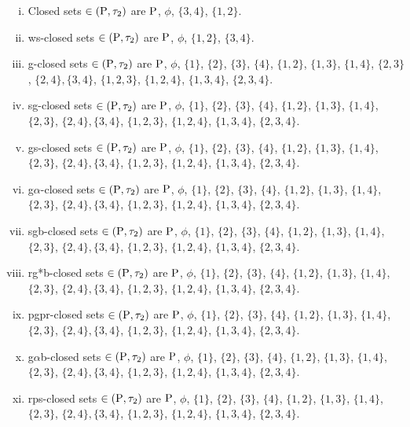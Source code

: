 \begin{exm}
\begin{enumerate}[(i)]
\item Closed sets $\in(\mathrm{P}, \tau_{2})$ are $\mathrm{P}$, $\phi$, $\{3, 4\}$, $\{1, 2\}$.
\item ws-closed sets $\in(\mathrm{P}, \tau_{2})$ are $\mathrm{P}$, $\phi$, $\{1, 2\}$, $\{3, 4\}$.
\item g-closed sets $\in(\mathrm{P}, \tau_{2})$ are $\mathrm{P}$, $\phi$, $\{1\}$, $\{2\}$, $\{3\}$, $\{4\}$, $\{1, 2\}$, $\{1, 3\}$, $\{1, 4\}$, $\{2, 3\}$, $\{2, 4\}, \{3, 4\}$, $\{1, 2, 3\}$, $\{1, 2, 4\}$, $\{1, 3, 4\}$, $\{2, 3, 4\}$.
\item sg-closed sets $\in(\mathrm{P}, \tau_{2})$ are $\mathrm{P}$, $\phi$, $\{1\}$, $\{2\}$, $\{3\}$, $\{4\}$, $\{1, 2\}$, $\{1, 3\}$, $\{1, 4\}$, $\{2, 3\}$, $\{2, 4\}, \{3, 4\}$, $\{1, 2, 3\}$, $\{1, 2, 4\}$, $\{1, 3, 4\}$, $\{2, 3, 4\}$.
\item gs-closed sets $\in(\mathrm{P}, \tau_{2})$ are $\mathrm{P}$, $\phi$, $\{1\}$, $\{2\}$, $\{3\}$, $\{4\}$, $\{1, 2\}$, $\{1, 3\}$, $\{1, 4\}$, $\{2, 3\}$, $\{2, 4\}, \{3, 4\}$, $\{1, 2, 3\}$, $\{1, 2, 4\}$, $\{1, 3, 4\}$, $\{2, 3, 4\}$.
\item g$\alpha$-closed sets $\in(\mathrm{P}, \tau_{2})$ are $\mathrm{P}$, $\phi$, $\{1\}$, $\{2\}$, $\{3\}$, $\{4\}$, $\{1, 2\}$, $\{1, 3\}$, $\{1, 4\}$, $\{2, 3\}$, $\{2, 4\}, \{3, 4\}$, $\{1, 2, 3\}$, $\{1, 2, 4\}$, $\{1, 3, 4\}$, $\{2, 3, 4\}$.
\item sgb-closed sets $\in(\mathrm{P}, \tau_{2})$ are $\mathrm{P}$, $\phi$, $\{1\}$, $\{2\}$, $\{3\}$, $\{4\}$, $\{1, 2\}$, $\{1, 3\}$, $\{1, 4\}$, $\{2, 3\}$, $\{2, 4\}, \{3, 4\}$, $\{1, 2, 3\}$, $\{1, 2, 4\}$, $\{1, 3, 4\}$, $\{2, 3, 4\}$.
\item rg*b-closed sets $\in(\mathrm{P}, \tau_{2})$ are $\mathrm{P}$, $\phi$, $\{1\}$, $\{2\}$, $\{3\}$, $\{4\}$, $\{1, 2\}$, $\{1, 3\}$, $\{1, 4\}$, $\{2, 3\}$, $\{2, 4\}, \{3, 4\}$, $\{1, 2, 3\}$, $\{1, 2, 4\}$, $\{1, 3, 4\}$, $\{2, 3, 4\}$.
\item pgpr-closed sets $\in(\mathrm{P}, \tau_{2})$ are $\mathrm{P}$, $\phi$, $\{1\}$, $\{2\}$, $\{3\}$, $\{4\}$, $\{1, 2\}$, $\{1, 3\}$, $\{1, 4\}$, $\{2, 3\}$, $\{2, 4\}, \{3, 4\}$, $\{1, 2, 3\}$, $\{1, 2, 4\}$, $\{1, 3, 4\}$, $\{2, 3, 4\}$.
\item g$\alpha$b-closed sets $\in(\mathrm{P}, \tau_{2})$ are $\mathrm{P}$, $\phi$, $\{1\}$, $\{2\}$, $\{3\}$, $\{4\}$, $\{1, 2\}$, $\{1, 3\}$, $\{1, 4\}$, $\{2, 3\}$, $\{2, 4\}, \{3, 4\}$, $\{1, 2, 3\}$, $\{1, 2, 4\}$, $\{1, 3, 4\}$, $\{2, 3, 4\}$.
\item rps-closed sets $\in(\mathrm{P}, \tau_{2})$ are $\mathrm{P}$, $\phi$, $\{1\}$, $\{2\}$, $\{3\}$, $\{4\}$, $\{1, 2\}$, $\{1, 3\}$, $\{1, 4\}$, $\{2, 3\}$, $\{2, 4\}, \{3, 4\}$, $\{1, 2, 3\}$, $\{1, 2, 4\}$, $\{1, 3, 4\}$, $\{2, 3, 4\}$.
\end{enumerate}


\end{exm}

